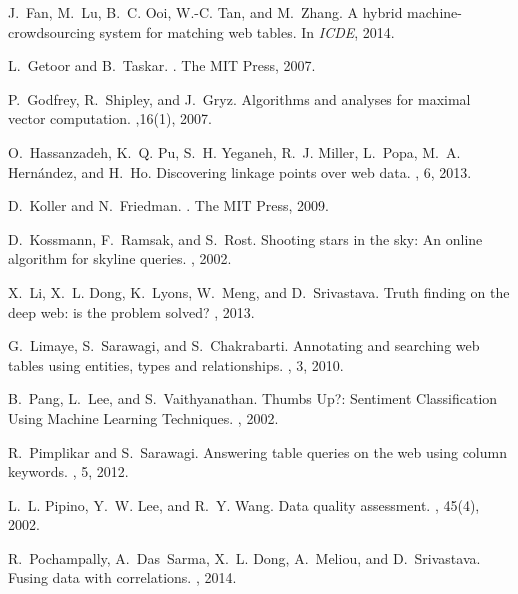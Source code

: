 \documentclass{sig-alternate}
\begin{document}
\begin{thebibliography}{10}
J.~Fan, M.~Lu, B.~C. Ooi, W.-C. Tan, and M.~Zhang.
\newblock A hybrid machine-crowdsourcing system for matching web tables.
\newblock In {\em ICDE}, 2014.

L.~Getoor and B.~Taskar.
.
\newblock The MIT Press, 2007.

P.~Godfrey, R.~Shipley, and J.~Gryz.
\newblock Algorithms and analyses for maximal vector computation.
,16(1), 2007.

O.~Hassanzadeh, K.~Q. Pu, S.~H. Yeganeh, R.~J. Miller, L.~Popa, M.~A.
  Hern{\'a}ndez, and H.~Ho.
\newblock Discovering linkage points over web data.
, 6, 2013.


D.~Koller and N.~Friedman.
.
\newblock The MIT Press, 2009.

D.~Kossmann, F.~Ramsak, and S.~Rost.
\newblock Shooting stars in the sky: An online algorithm for skyline queries.
, 2002.

X.~Li, X.~L. Dong, K.~Lyons, W.~Meng, and D.~Srivastava.
\newblock Truth finding on the deep web: is the problem solved?
, 2013.

G.~Limaye, S.~Sarawagi, and S.~Chakrabarti.
\newblock Annotating and searching web tables using entities, types and
  relationships.
, 3, 2010.

B.~Pang, L.~Lee, and S.~Vaithyanathan.
\newblock Thumbs Up?: Sentiment Classification Using Machine Learning Techniques.
, 2002.

R.~Pimplikar and S.~Sarawagi.
\newblock Answering table queries on the web using column keywords.
, 5, 2012.

L.~L. Pipino, Y.~W. Lee, and R.~Y. Wang.
\newblock Data quality assessment.
, 45(4), 2002.

R.~Pochampally, A.~Das~Sarma, X.~L. Dong, A.~Meliou, and D.~Srivastava.
\newblock Fusing data with correlations.
, 2014.


\end{thebibliography}
\end{document}
